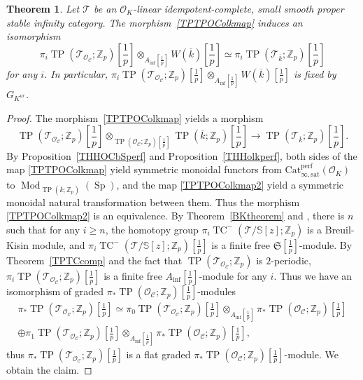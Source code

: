 \documentclass[11pt]{amsart}
\newcommand{\Z}{\mathbb{Z}}
\newcommand{\sO}{\mathcal{O}}
\newcommand{\sT}{\mathcal{T}}
\newcommand{\bS}{\mathbb{S}}
\newcommand{\Mod}{\operatorname{Mod}}
\newcommand{\TP}{\operatorname{TP}}
\newcommand{\TCn}{\operatorname{TC}^{-}}
\newcommand{\ol}{\overline}
\newcommand{\Ainf}{A_{\operatorname{inf}}}
\newcommand{\Cu}{\mathcal{C}}
\newcommand{\mS}{\mathfrak{S}}
\newcommand{\Catsat}{\operatorname{Cat_{\infty,sat}^{perf}}}
\newcommand{\Sp}{\operatorname{Sp}}
\newtheorem{thm}[lemma]{Theorem}
\theoremstyle{definition}
\theoremstyle{remark}
\numberwithin{equation}{section}
\begin{document}
\begin{thm}\label{TPTPOColkcomp}
Let $\sT$ be an $\sO_K$-linear idempotent-complete, small smooth proper stable infinity category. The morphism~\eqref{TPTPOColkmap} induces an isomorphism
\[
\pi_i\TP(\sT_{\sO_\Cu};\Z_p)[\frac{1}{p}] \otimes_{\Ainf[\frac{1}{p}]} W(\ol{k})[\frac{1}{p}] \simeq \pi_i\TP(\sT_{\ol{k}};\Z_p)[\frac{1}{p}]
\]
for any $i$. In particular, $\pi_i\TP(\sT_{\sO_\Cu};\Z_p)[\frac{1}{p}]\otimes_{\Ainf[\frac{1}{p}]} W(\ol{k})[\frac{1}{p}]$ is fixed by $G_{K^{ur}}$.
\end{thm}
\begin{proof}
The morphism~\eqref{TPTPOColkmap} yields a morphism
\begin{equation}\label{TPTPOColkmap2}
\TP(\sT_{\sO_\Cu};\Z_p)[\frac{1}{p}]\otimes_{\TP(\sO_\Cu;\Z_p)[\frac{1}{p}]} \TP(\ol{k};\Z_p)[\frac{1}{p}] \to \TP(\sT_{\ol{k}};\Z_p)[\frac{1}{p}].
\end{equation}
 By Proposition~\ref{THHOCbSperf} and Proposition~\ref{THHolkperf}, both sides of the map \eqref{TPTPOColkmap} yield symmetric monoidal functors from $\Catsat(\sO_K)$ to $\Mod_{\TP(\ol{k};\Z_p)}(\Sp)$, and the map \eqref{TPTPOColkmap2} yield a symmetric monoidal natural transformation between them. Thus the morphism \eqref{TPTPOColkmap2} is an equivalence. By Theorem~\ref{BKtheorem} and \cite[Proposition 4.3]{BMS1}, there is $n$ such that for any $i\geq n$, the homotopy group $\pi_i\TCn(\sT/\bS[z];\Z_p)$ is a Breuil-Kisin module, and $\pi_i\TCn(\sT/\bS[z];\Z_p)[\frac{1}{p}]$ is a finite free $\mS[\frac{1}{p}]$-module. By Theorem~\ref{TPTCcomp} and the fact that $\TP(\sT_{\sO_\Cu};\Z_p)$ is $2$-periodic, $\pi_i\TP(\sT_{\sO_\Cu};\Z_p)[\frac{1}{p}]$ is a finite free $\Ainf[\frac{1}{p}]$-module for any $i$. Thus we have an isomorphism of graded $\pi_*\TP(\sO_\Cu;\Z_p)[\frac{1}{p}]$-modules \begin{eqnarray}\label{flatmap2}
 \pi_*\TP(\sT_{\sO_\Cu};\Z_p)[\frac{1}{p}]\simeq \pi_0\TP(\sT_{\sO_\Cu};\Z_p)[\frac{1}{p}]\otimes_{\Ainf[\frac{1}{p}]} \pi_*\TP(\sO_\Cu;\Z_p)[\frac{1}{p}] \\
 \oplus \pi_1\TP(\sT_{\sO_\Cu};\Z_p)[\frac{1}{p}]\otimes_{\Ainf[\frac{1}{p}]}\pi_*\TP(\sO_\Cu;\Z_p)[\frac{1}{p}],\nonumber
  \end{eqnarray}
  thus $\pi_*\TP(\sT_{\sO_\Cu};\Z_p)[\frac{1}{p}]$ is a flat graded $\pi_*\TP(\sO_\Cu;\Z_p)[\frac{1}{p}]$-module. We obtain the claim.
\end{proof}
\end{document}
